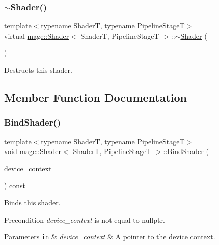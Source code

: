 \subsubsection{\texorpdfstring{$\sim$\+Shader()}{~Shader()}}
{\footnotesize\ttfamily template$<$typename ShaderT, typename Pipeline\+StageT$>$ \\
virtual \hyperlink{classmage_1_1_shader}{mage\+::\+Shader}$<$ ShaderT, Pipeline\+StageT $>$\+::$\sim$\hyperlink{classmage_1_1_shader}{Shader} (\begin{DoxyParamCaption}{ }\end{DoxyParamCaption})\hspace{0.3cm}{\ttfamily [virtual]}}

Destructs this shader. 

\subsection{Member Function Documentation}
\hypertarget{classmage_1_1_shader_a64ad7404bd0fccc96debd67a4ba4beed}{}\label{classmage_1_1_shader_a64ad7404bd0fccc96debd67a4ba4beed} 
\subsubsection{\texorpdfstring{Bind\+Shader()}{BindShader()}}
{\footnotesize\ttfamily template$<$typename ShaderT, typename Pipeline\+StageT$>$ \\
void \hyperlink{classmage_1_1_shader}{mage\+::\+Shader}$<$ ShaderT, Pipeline\+StageT $>$\+::Bind\+Shader (\begin{DoxyParamCaption}\item[{I\+D3\+D11\+Device\+Context2 $\ast$}]{device\+\_\+context }\end{DoxyParamCaption}) const\hspace{0.3cm}{\ttfamily [noexcept]}}

Binds this shader.

\begin{DoxyPrecond}{Precondition}
{\itshape device\+\_\+context} is not equal to {\ttfamily nullptr}. 
\end{DoxyPrecond}

\begin{DoxyParams}[1]{Parameters}
\mbox{\tt in}  & {\em device\+\_\+context} & A pointer to the device context. \\
\hline
\end{DoxyParams}
\hypertarget{classmage_1_1_shader_a235c45ff470f15367cc7381da0f01130}{}\label{classmage_1_1_shader_a235c45ff470f15367cc7381da0f01130} 
